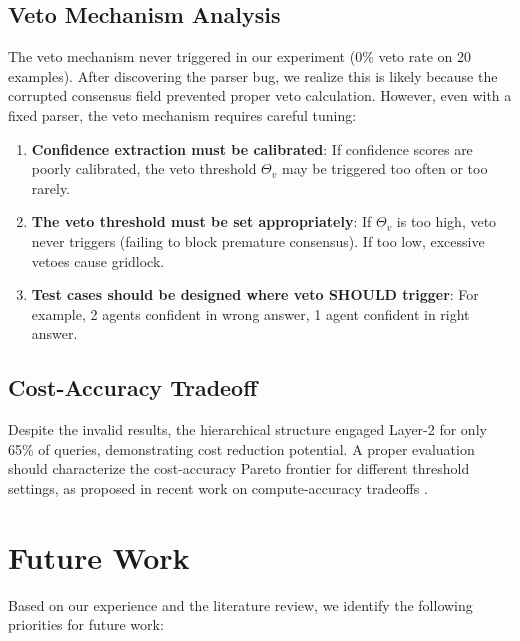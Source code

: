\documentclass[11pt,letterpaper]{article}
\begin{document}
\subsection{Veto Mechanism Analysis}

The veto mechanism never triggered in our experiment (0\% veto rate on 20 examples). After discovering the parser bug, we realize this is likely because the corrupted consensus field prevented proper veto calculation. However, even with a fixed parser, the veto mechanism requires careful tuning:

\begin{enumerate}
\item \textbf{Confidence extraction must be calibrated}: If confidence scores are poorly calibrated, the veto threshold $\Theta_v$ may be triggered too often or too rarely.
\item \textbf{The veto threshold must be set appropriately}: If $\Theta_v$ is too high, veto never triggers (failing to block premature consensus). If too low, excessive vetoes cause gridlock.
\item \textbf{Test cases should be designed where veto SHOULD trigger}: For example, 2 agents confident in wrong answer, 1 agent confident in right answer.
\end{enumerate}

\subsection{Cost-Accuracy Tradeoff}

Despite the invalid results, the hierarchical structure engaged Layer-2 for only 65\% of queries, demonstrating cost reduction potential. A proper evaluation should characterize the cost-accuracy Pareto frontier for different threshold settings, as proposed in recent work on compute-accuracy tradeoffs \cite{Prucs2025}.

\section{Future Work}

Based on our experience and the literature review, we identify the following priorities for future work:
\end{document}
